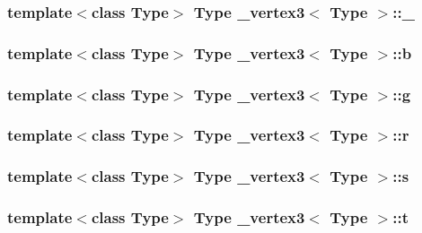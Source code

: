 \hypertarget{class__vertex3_a1c2c36bb8ba8936a1558c95c5c01c7e6}{
\subsubsection[{\+\_\+2}]{\setlength{\rightskip}{0pt plus 5cm}template$<$class Type$>$ Type {\bf \+\_\+vertex3}$<$ Type $>$\+::\+\_}}\label{class__vertex3_a1c2c36bb8ba8936a1558c95c5c01c7e6}
\hypertarget{class__vertex3_a246eb51f4f972bbac5471706930f24e1}{
\subsubsection[{b}]{\setlength{\rightskip}{0pt plus 5cm}template$<$class Type$>$ Type {\bf \+\_\+vertex3}$<$ Type $>$\+::b}}\label{class__vertex3_a246eb51f4f972bbac5471706930f24e1}
\hypertarget{class__vertex3_afda5a2b8b0a3c5605493b9232cfc53fe}{
\subsubsection[{g}]{\setlength{\rightskip}{0pt plus 5cm}template$<$class Type$>$ Type {\bf \+\_\+vertex3}$<$ Type $>$\+::g}}\label{class__vertex3_afda5a2b8b0a3c5605493b9232cfc53fe}
\hypertarget{class__vertex3_a6125a752b7c401d1cd2358095230066a}{
\subsubsection[{r}]{\setlength{\rightskip}{0pt plus 5cm}template$<$class Type$>$ Type {\bf \+\_\+vertex3}$<$ Type $>$\+::r}}\label{class__vertex3_a6125a752b7c401d1cd2358095230066a}
\hypertarget{class__vertex3_ad6bc128f82b0fe46d9f191a50351b220}{
\subsubsection[{s}]{\setlength{\rightskip}{0pt plus 5cm}template$<$class Type$>$ Type {\bf \+\_\+vertex3}$<$ Type $>$\+::s}}\label{class__vertex3_ad6bc128f82b0fe46d9f191a50351b220}
\hypertarget{class__vertex3_a28a2457f6b56e4357144f17d41c4a76c}{
\subsubsection[{t}]{\setlength{\rightskip}{0pt plus 5cm}template$<$class Type$>$ Type {\bf \+\_\+vertex3}$<$ Type $>$\+::t}}\label{class__vertex3_a28a2457f6b56e4357144f17d41c4a76c}
